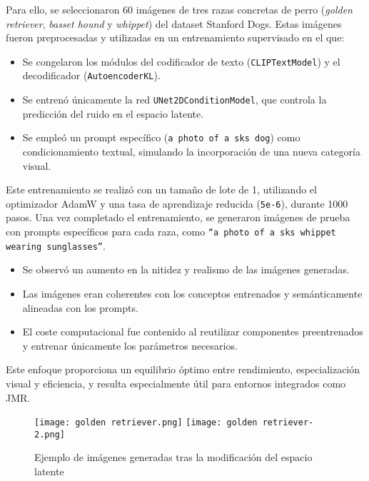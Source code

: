 Para ello, se seleccionaron 60 imágenes de tres razas concretas de perro (\textit{golden retriever}, \textit{basset hound} y \textit{whippet}) del dataset Stanford Dogs. Estas imágenes fueron preprocesadas y utilizadas en un entrenamiento supervisado en el que:

\begin{itemize}
    \item Se congelaron los módulos del codificador de texto (\texttt{CLIPTextModel}) y el decodificador (\texttt{AutoencoderKL}).
    \item Se entrenó únicamente la red \texttt{UNet2DConditionModel}, que controla la predicción del ruido en el espacio latente.
    \item Se empleó un prompt específico (\texttt{a photo of a sks dog}) como condicionamiento textual, simulando la incorporación de una nueva categoría visual.
\end{itemize}

Este entrenamiento se realizó con un tamaño de lote de 1, utilizando el optimizador AdamW y una tasa de aprendizaje reducida (\texttt{5e-6}), durante 1000 pasos. Una vez completado el entrenamiento, se generaron imágenes de prueba con prompts específicos para cada raza, como \texttt{``a photo of a sks whippet wearing sunglasses''}.

\begin{itemize}
    \item Se observó un aumento en la nitidez y realismo de las imágenes generadas.
    \item Las imágenes eran coherentes con los conceptos entrenados y semánticamente alineadas con los prompts.
    \item El coste computacional fue contenido al reutilizar componentes preentrenados y entrenar únicamente los parámetros necesarios.
\end{itemize}

Este enfoque proporciona un equilibrio óptimo entre rendimiento, especialización visual y eficiencia, y resulta especialmente útil para entornos integrados como JMR.

\begin{figure}[H]
    \centering
    \texttt{[image: golden retriever.png]}
    \hfill
    \texttt{[image: golden retriever-2.png]}
    \caption{Ejemplo de imágenes generadas tras la modificación del espacio latente}
    \label{fig:latent-space-optimization}
\end{figure}